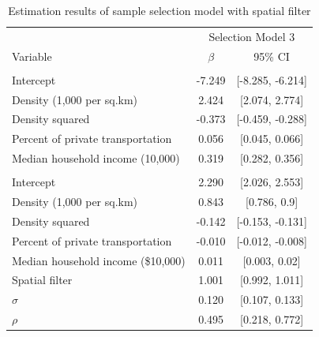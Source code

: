 \documentclass[preprint, 3p,
authoryear]{elsarticle} %
\begin{document}
\begin{table}[!h]

\caption{\label{tab:tabulate-sample-selection3-results}\label{tab:selection3-results}Estimation results of sample selection model with spatial filter}
\centering
\fontsize{8}{10}\selectfont
\begin{tabular}[t]{lcc}
\toprule
\multicolumn{1}{c}{ } & \multicolumn{2}{c}{Selection Model 3} \\
\cmidrule(l{3pt}r{3pt}){2-3}
Variable & $\beta$ & 95\% CI\\
\midrule
\addlinespace[0.3em]
\multicolumn{3}{l}{\textbf{Sample Selection Model}}\\
\hspace{1em}Intercept & -7.249 & {}[-8.285, -6.214]\\
\hspace{1em}Density (1,000 per sq.km) & 2.424 & {}[2.074, 2.774]\\
\hspace{1em}Density squared & -0.373 & {}[-0.459, -0.288]\\
\hspace{1em}Percent of private transportation & 0.056 & {}[0.045, 0.066]\\
\hspace{1em}Median household income (10,000) & 0.319 & {}[0.282, 0.356]\\
\addlinespace[0.3em]
\multicolumn{3}{l}{\textbf{Outcome Model}}\\
\hspace{1em}Intercept & 2.290 & {}[2.026, 2.553]\\
\hspace{1em}Density (1,000 per sq.km) & 0.843 & {}[0.786, 0.9]\\
\hspace{1em}Density squared & -0.142 & {}[-0.153, -0.131]\\
\hspace{1em}Percent of private transportation & -0.010 & {}[-0.012, -0.008]\\
\hspace{1em}Median household income (\$10,000) & 0.011 & {}[0.003, 0.02]\\
\hspace{1em}Spatial filter & 1.001 & {}[0.992, 1.011]\\
$\sigma$ & 0.120 & {}[0.107, 0.133]\\
$\rho$ & 0.495 & {}[0.218, 0.772]\\
\bottomrule
\end{tabular}
\end{table}
\end{document}
